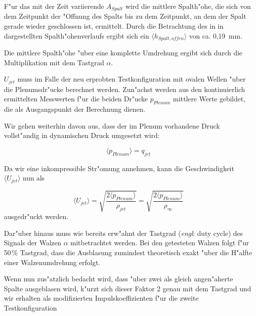 F"ur das mit der Zeit variierende $A_{Spalt}$   wird die mittlere Spalth"ohe, die sich von dem Zeitpunkt der "Offnung des Spalts bis zu dem Zeitpunkt, an dem der Spalt gerade wieder geschlossen ist, ermittelt.  
Durch die Betrachtung des in  in  dargestellten Spalth"ohenverlaufs ergibt sich ein $\langle{h_{Spalt,offen}}\rangle$ von ca. 0,19 \,mm.

Die mittlere Spalth"ohe "uber eine komplette Umdrehung ergibt sich durch die Multiplikation mit dem Tastgrad $\alpha$.

$U_{jet}$ muss im Falle der neu erprobten Testkonfiguration mit ovalen Wellen "uber die Plenumsdr"ucke berechnet werden.
Zun"achst werden aus den kontinuierlich ermittelten Messwerten f"ur die beiden Dr"ucke $p_{Plenum}$ mittlere Werte gebildet, die als Ausgangspunkt der Berechnung dienen.

Wir gehen weiterhin davon aus, dass der im Plenum vorhandene Druck vollst"andig in dynamischen Druck umgesetzt wird:

	\begin{equation}
	\label{eq:Annahme q}
		\langle{p_{Plenum}}\rangle = q_{jet}
	\end{equation}

Da wir eine inkompressible Str"omung annehmen, kann die Geschwindigkeit $\langle{U_{jet}}\rangle$ nun als
	
	\begin{equation}
	\label{eq:jetgeschwindigkeit}
		\langle{U_{jet}}\rangle = \sqrt{\frac{2 \langle{p_{Plenum}}\rangle}{\rho_{jet}}} = \sqrt{\frac{2 \langle{p_{Plenum}}\rangle}{\rho_{\infty}}}
	\end{equation}
ausgedr"uckt werden.

Dar"uber hinaus muss wie bereits erw"ahnt der Tastgrad (\textit{engl}: duty cycle) des Signals der Walzen $\alpha$  mitbetrachtet werden.
Bei den getesteten Walzen folgt f"ur 50\,\% Tastgrad, dass die Ausblasung zumindest theoretisch exakt "uber die H"alfte einer Walzenumdrehung erfolgt.

Wenn nun zus"atzlich bedacht wird, dass "uber zwei als gleich angen"aherte Spalte ausgeblasen wird, k"urzt sich dieser Faktor 2 genau mit dem Tastgrad und wir erhalten als modifizierten Impulskoeffizienten f"ur die zweite Testkonfiguration


